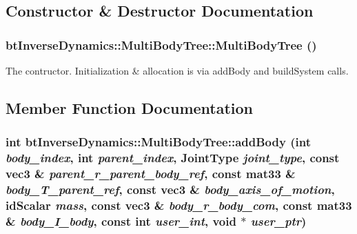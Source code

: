 \subsection{Constructor \& Destructor Documentation}
\hypertarget{classbt_inverse_dynamics_1_1_multi_body_tree_75c5f172165331d0c64f7fc02301b12a}{
\subsubsection[MultiBodyTree]{\setlength{\rightskip}{0pt plus 5cm}btInverseDynamics::MultiBodyTree::MultiBodyTree ()}}
\label{classbt_inverse_dynamics_1_1_multi_body_tree_75c5f172165331d0c64f7fc02301b12a}


The contructor. Initialization \& allocation is via addBody and buildSystem calls. 

\subsection{Member Function Documentation}
\hypertarget{classbt_inverse_dynamics_1_1_multi_body_tree_d1f6d18e60ec7be3ec03b5aa9b8875b6}{
\subsubsection[addBody]{\setlength{\rightskip}{0pt plus 5cm}int btInverseDynamics::MultiBodyTree::addBody (int {\em body\_\-index}, \/  int {\em parent\_\-index}, \/  JointType {\em joint\_\-type}, \/  const {\bf vec3} \& {\em parent\_\-r\_\-parent\_\-body\_\-ref}, \/  const mat33 \& {\em body\_\-T\_\-parent\_\-ref}, \/  const {\bf vec3} \& {\em body\_\-axis\_\-of\_\-motion}, \/  idScalar {\em mass}, \/  const {\bf vec3} \& {\em body\_\-r\_\-body\_\-com}, \/  const mat33 \& {\em body\_\-I\_\-body}, \/  const int {\em user\_\-int}, \/  void $\ast$ {\em user\_\-ptr})}}
\label{classbt_inverse_dynamics_1_1_multi_body_tree_d1f6d18e60ec7be3ec03b5aa9b8875b6}


